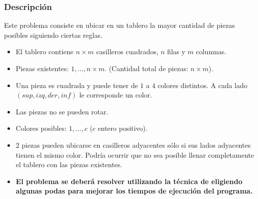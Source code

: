 \documentclass[11pt, a4paper, twoside]{article}
\begin{document}
{}

\subsubsection{Descripción}\label{subsubsec:problema3-descripcion}

Este problema consiste en ubicar en un tablero la mayor cantidad de piezas
posibles siguiendo ciertas reglas.


\begin{itemize}   
	\item El tablero contiene $n \times m$ casilleros cuadrados, $n$ filas y $m$
	columnas.

	\item Piezas existentes: $1,...,n \times m$. (Cantidad total de
	piezas: $n \times m$).

	\item Una pieza es cuadrada y puede tener de $1$ a $4$ colores distintos.
	A cada lado $(sup, izq, der, inf)$ le corresponde un color.

	\item Las piezas no se pueden rotar.

	\item Colores posibles: $1,...,c$ ($c$ entero positivo).

	\item 2 piezas pueden ubicarse en casilleros adyacentes sólo si sus lados
	adyacentes tienen el mismo color. Podría ocurrir que no sea posible
	llenar completamente el tablero con las piezas existentes.



  \item \textbf{El problema se deberá resolver utilizando la técnica de
     eligiendo algunas podas para mejorar los tiempos de
    ejecución del programa.}

\end{itemize}

\end{document}
